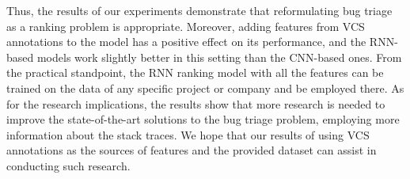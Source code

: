 Thus, the results of our experiments demonstrate that reformulating bug triage as a ranking problem is appropriate. Moreover, adding features from VCS annotations to the model has a positive effect on its performance, and the RNN-based models work slightly better in this setting than the CNN-based ones. From the practical standpoint, the RNN ranking model with all the features can be trained on the data of any specific project or company and be employed there. As for the research implications, the results show that more research is needed to improve the state-of-the-art solutions to the bug triage problem, employing more information about the stack traces. We hope that our results of using VCS annotations as the sources of features and the provided dataset can assist in conducting such research.